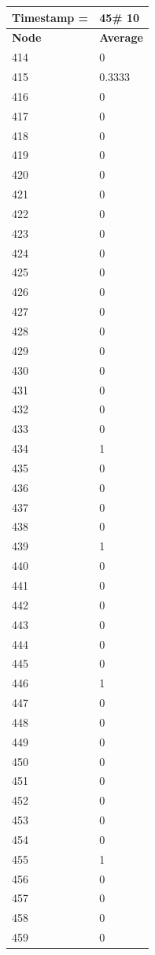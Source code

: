 \begin{tabular}{|l||l|}
\hline
\textbf{Timestamp =} & \textbf{45}\# 10\\\hline
	\textbf{Node} & \textbf{Average} \\ \hline
\hline
	414 & 0 \\ \hline
	415 & 0.3333 \\ \hline
	416 & 0 \\ \hline
	417 & 0 \\ \hline
	418 & 0 \\ \hline
	419 & 0 \\ \hline
	420 & 0 \\ \hline
	421 & 0 \\ \hline
	422 & 0 \\ \hline
	423 & 0 \\ \hline
	424 & 0 \\ \hline
	425 & 0 \\ \hline
	426 & 0 \\ \hline
	427 & 0 \\ \hline
	428 & 0 \\ \hline
	429 & 0 \\ \hline
	430 & 0 \\ \hline
	431 & 0 \\ \hline
	432 & 0 \\ \hline
	433 & 0 \\ \hline
	434 & 1 \\ \hline
	435 & 0 \\ \hline
	436 & 0 \\ \hline
	437 & 0 \\ \hline
	438 & 0 \\ \hline
	439 & 1 \\ \hline
	440 & 0 \\ \hline
	441 & 0 \\ \hline
	442 & 0 \\ \hline
	443 & 0 \\ \hline
	444 & 0 \\ \hline
	445 & 0 \\ \hline
	446 & 1 \\ \hline
	447 & 0 \\ \hline
	448 & 0 \\ \hline
	449 & 0 \\ \hline
	450 & 0 \\ \hline
	451 & 0 \\ \hline
	452 & 0 \\ \hline
	453 & 0 \\ \hline
	454 & 0 \\ \hline
	455 & 1 \\ \hline
	456 & 0 \\ \hline
	457 & 0 \\ \hline
	458 & 0 \\ \hline
	459 & 0 \\ \hline
\end{tabular}
